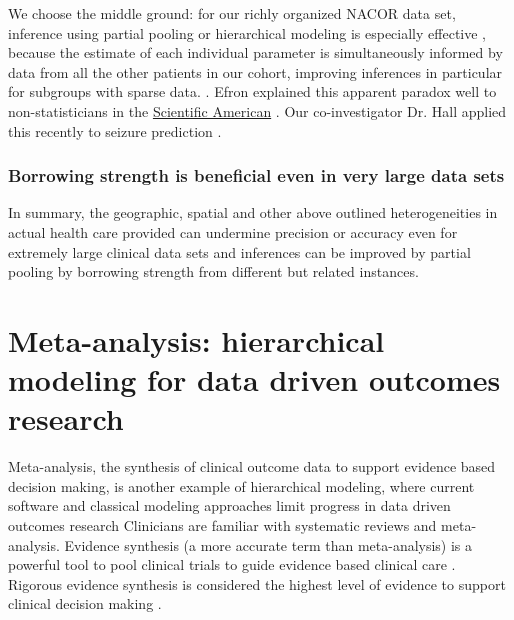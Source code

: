 \documentclass[11pt,notitlepage]{article}
\begin{document}
We choose the middle ground: for our richly organized NACOR data set, inference using partial pooling or hierarchical modeling is especially effective , because the estimate of each individual parameter is simultaneously informed by data from all the other patients in our cohort, improving inferences in particular for subgroups with sparse data. \cite{Gelman2009}. Efron explained this apparent paradox well to non-statisticians in the \href{http://www.nature.com/scientificamerican/journal/v236/n5/pdf/scientificamerican0577-119.pdf}{Scientific American} \cite{Stein_paradox_Scientific_American}. Our co-investigator Dr. Hall applied this recently to seizure prediction \cite{Hall2009a}. 

\subsubsection*{Borrowing strength is beneficial even in very large data sets}
In summary, the geographic, spatial and other above outlined heterogeneities in actual health care provided can undermine precision or accuracy even for extremely large clinical data sets and inferences can be improved by partial pooling by borrowing strength from different but related instances\cite{Tukey1963borrowing,Jones1986collected}. 

\section*{Meta-analysis: hierarchical modeling for data driven outcomes research}
Meta-analysis, the synthesis of clinical outcome data to support evidence based decision making, is another example of hierarchical modeling, where current software and classical modeling approaches limit progress in data driven outcomes research \cite{Andreae2015} Clinicians are familiar with systematic reviews and meta-analysis\cite{Sackett1996}. Evidence synthesis (a more accurate term than meta-analysis) is a powerful tool to pool clinical trials to guide evidence based clinical care \cite{Ashby2000}. Rigorous evidence synthesis is considered the highest level of evidence to support clinical decision making \cite{Cook1997}. 
\end{document}
